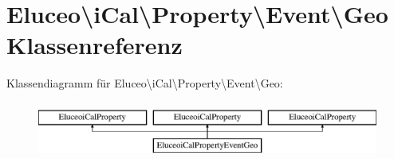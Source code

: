 \hypertarget{class_eluceo_1_1i_cal_1_1_property_1_1_event_1_1_geo}{}\section{Eluceo\textbackslash{}i\+Cal\textbackslash{}Property\textbackslash{}Event\textbackslash{}Geo Klassenreferenz}
\label{class_eluceo_1_1i_cal_1_1_property_1_1_event_1_1_geo}
Klassendiagramm für Eluceo\textbackslash{}i\+Cal\textbackslash{}Property\textbackslash{}Event\textbackslash{}Geo\+:\begin{figure}[H]
\begin{center}
\leavevmode
\includegraphics[height=1.857380cm]{class_eluceo_1_1i_cal_1_1_property_1_1_event_1_1_geo}
\end{center}
\end{figure}
